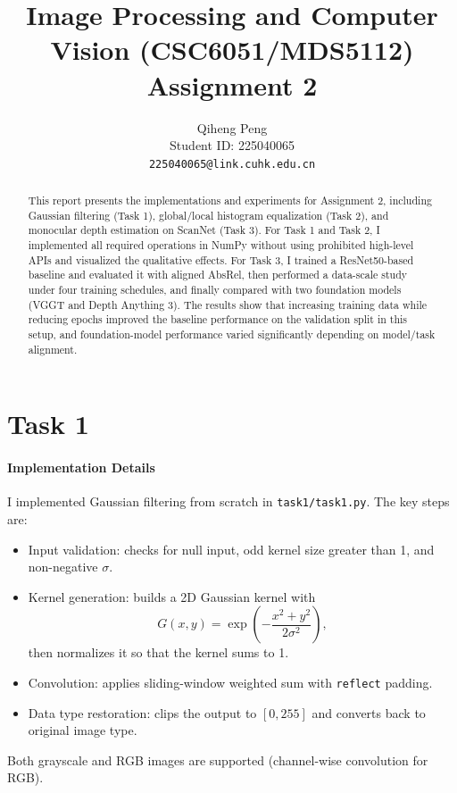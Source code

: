 \documentclass[final]{cvpr}
\begin{document}
\title{Image Processing and Computer Vision (CSC6051/MDS5112)  \\ Assignment 2}

\author{Qiheng Peng\\
Student ID: 225040065\\
{\tt\small 225040065@link.cuhk.edu.cn}
}

\maketitle


\begin{abstract}
This report presents the implementations and experiments for Assignment 2, including Gaussian filtering (Task 1), global/local histogram equalization (Task 2), and monocular depth estimation on ScanNet (Task 3). For Task 1 and Task 2, I implemented all required operations in NumPy without using prohibited high-level APIs and visualized the qualitative effects. For Task 3, I trained a ResNet50-based baseline and evaluated it with aligned AbsRel, then performed a data-scale study under four training schedules, and finally compared with two foundation models (VGGT and Depth Anything 3). The results show that increasing training data while reducing epochs improved the baseline performance on the validation split in this setup, and foundation-model performance varied significantly depending on model/task alignment.
\end{abstract}

\section{Task 1}

\paragraph{Implementation Details}
I implemented Gaussian filtering from scratch in \texttt{task1/task1.py}. The key steps are:
\begin{itemize}
   \item Input validation: checks for null input, odd kernel size greater than 1, and non-negative $\sigma$.
   \item Kernel generation: builds a 2D Gaussian kernel with
   \begin{equation}
      G(x,y)=\exp\left(-\frac{x^2+y^2}{2\sigma^2}\right),
   \end{equation}
   then normalizes it so that the kernel sums to 1.
   \item Convolution: applies sliding-window weighted sum with \texttt{reflect} padding.
   \item Data type restoration: clips the output to $[0,255]$ and converts back to original image type.
\end{itemize}
Both grayscale and RGB images are supported (channel-wise convolution for RGB).
\end{document}
